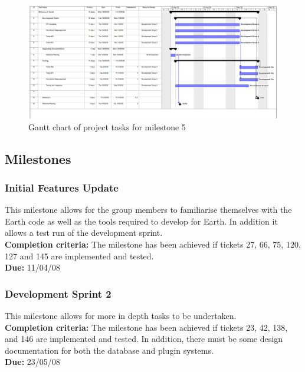 \documentclass{article}
\begin{document}
\begin{figure}[htp]
\begin{centering}
\includegraphics[angle=90,scale=0.5]{./schedule-milestone5.jpg} 
\par\end{centering}
\caption{Gantt chart of project tasks for milestone 5}
\label{fig:schedule5} 
\end{figure}

\newpage{}

\subsection{Milestones}

\subsubsection{Initial Features Update}

This milestone allows for the group members to familiarise themselves with the Earth code as well as the tools required to develop for Earth. In addition it allows a test run of the development sprint.\\
\textbf{Completion criteria:} The milestone has been achieved if tickets 27, 66, 75, 120, 127 and 145 are implemented and tested.
\\
\textbf{Due:} 11/04/08

\subsubsection{Development Sprint 2}

This milestone allows for more in depth tasks to be undertaken. \\
\textbf{Completion criteria:} The milestone has been achieved if tickets 23, 42, 138, and 146 are implemented and tested. In addition, there must be some design documentation for both the database and plugin systems.
\\
\textbf{Due:} 23/05/08
\end{document}
